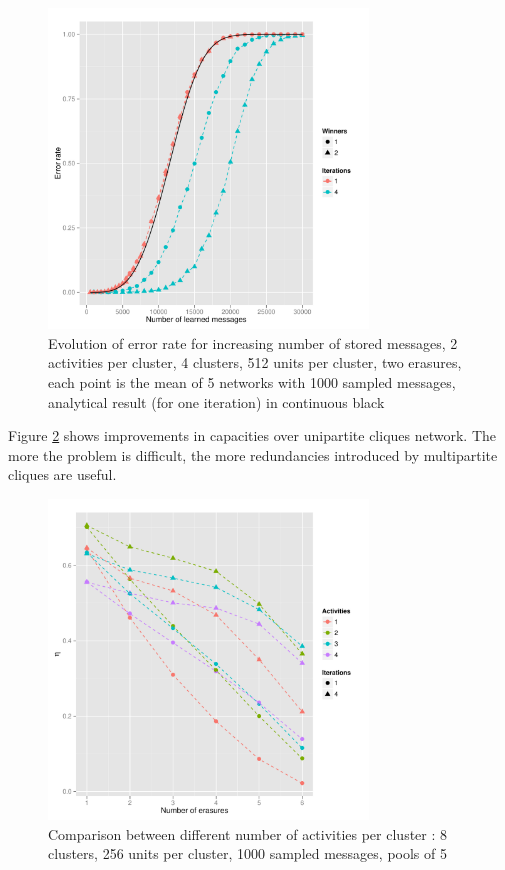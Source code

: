 \documentclass[english,10pt,twocolumn]{IEEEtran}
\theoremstyle{definition}
\begin{document}
	
	\begin{figure}[!htb]
		\includegraphics[width=8.5cm]{Courbes/remplacement_figure2g1} %
		\caption{Evolution of error rate for increasing number of stored messages, 2 activities per cluster, 4 clusters, 512 units per cluster, two erasures, each point is the mean of 5 networks with 1000 sampled messages, analytical result (for one iteration) in continuous black}
			\label{erasuresth}
		\end{figure}
		
		Figure \ref{comperth} shows improvements in capacities over unipartite cliques network. The more the problem is difficult, the more redundancies introduced by multipartite cliques are useful.
		
		\begin{figure}[!htb]
		\includegraphics[width=8.5cm]{Courbes/5portant_erasures_c8l256}
		\caption{Comparison between different number of activities per cluster :  8 clusters, 256 units per cluster, 1000 sampled messages, pools of 5}
		\label{comperth}
	\end{figure}
%	
	
\end{document}

